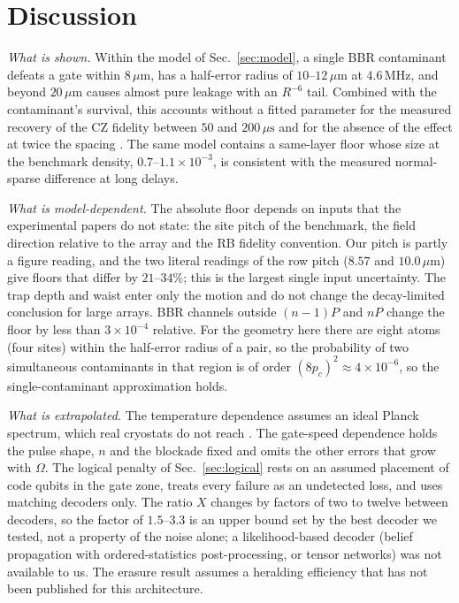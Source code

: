 \documentclass[aps,pra,twocolumn,superscriptaddress,longbibliography,floatfix]{revtex4-2}
\newcommand{\um}{\,\mu\mathrm{m}}
\newcommand{\us}{\,\mu\mathrm{s}}
\newcommand{\MHz}{\,\mathrm{MHz}}
\begin{document}
\section{Discussion}
\label{sec:discussion}

\textit{What is shown.} Within the model of Sec.~\ref{sec:model}, a single BBR contaminant defeats a gate within $8\um$, has a half-error radius of $10$--$12\um$ at $4.6\MHz$, and beyond $20\um$ causes almost pure leakage with an $R^{-6}$ tail. Combined with the contaminant's survival, this accounts without a fitted parameter for the measured recovery of the CZ fidelity between $50$ and $200\us$ and for the absence of the effect at twice the spacing \cite{Bluvstein2026}. The same model contains a same-layer floor whose size at the benchmark density, $0.7$--$1.1\times10^{-3}$, is consistent with the measured normal-sparse difference at long delays.

\textit{What is model-dependent.} The absolute floor depends on inputs that the experimental papers do not state: the site pitch of the benchmark, the field direction relative to the array and the RB fidelity convention. Our pitch is partly a figure reading, and the two literal readings of the row pitch ($8.57$ and $10.0\um$) give floors that differ by $21$--$34\%$; this is the largest single input uncertainty. The trap depth and waist enter only the motion and do not change the decay-limited conclusion for large arrays. BBR channels outside $(n-1)P$ and $nP$ change the floor by less than $3\times10^{-4}$ relative. For the geometry here there are eight atoms (four sites) within the half-error radius of a pair, so the probability of two simultaneous contaminants in that region is of order $(8p_c)^2\approx4\times10^{-6}$, so the single-contaminant approximation holds.

\textit{What is extrapolated.} The temperature dependence assumes an ideal Planck spectrum, which real cryostats do not reach \cite{Zhang2026}. The gate-speed dependence holds the pulse shape, $n$ and the blockade fixed and omits the other errors that grow with $\Omega$. The logical penalty of Sec.~\ref{sec:logical} rests on an assumed placement of code qubits in the gate zone, treats every failure as an undetected loss, and uses matching decoders only. The ratio $X$ changes by factors of two to twelve between decoders, so the factor of $1.5$--$3.3$ is an upper bound set by the best decoder we tested, not a property of the noise alone; a likelihood-based decoder (belief propagation with ordered-statistics post-processing, or tensor networks) was not available to us. The erasure result assumes a heralding efficiency that has not been published for this architecture.
\end{document}
